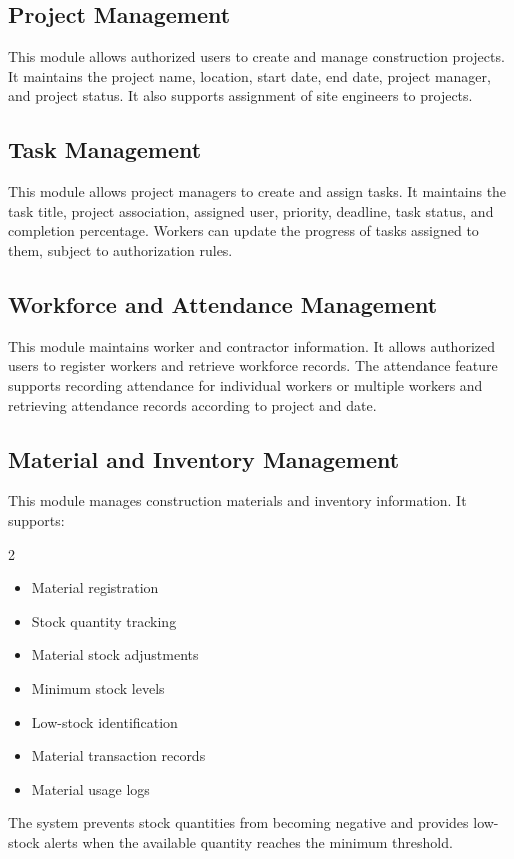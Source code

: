 \documentclass[11pt,a4paper]{article}
\begin{document}
\subsection{Project Management}
This module allows authorized users to create and manage construction projects. It maintains the project name, location, start date, end date, project manager, and project status. It also supports assignment of site engineers to projects.

\subsection{Task Management}
This module allows project managers to create and assign tasks. It maintains the task title, project association, assigned user, priority, deadline, task status, and completion percentage. Workers can update the progress of tasks assigned to them, subject to authorization rules.

\subsection{Workforce and Attendance Management}
This module maintains worker and contractor information. It allows authorized users to register workers and retrieve workforce records. The attendance feature supports recording attendance for individual workers or multiple workers and retrieving attendance records according to project and date.

\subsection{Material and Inventory Management}
This module manages construction materials and inventory information. It supports:
\begin{multicols}{2}
\begin{itemize}
\item Material registration
\item Stock quantity tracking
\item Material stock adjustments
\item Minimum stock levels
\item Low-stock identification
\item Material transaction records
\item Material usage logs
\end{itemize}
\end{multicols}
The system prevents stock quantities from becoming negative and provides low-stock alerts when the available quantity reaches the minimum threshold.
\end{document}
